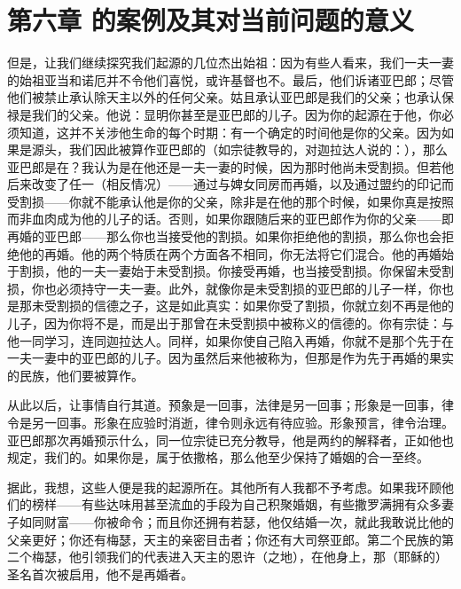 
\section{第六章 的案例及其对当前问题的意义}

但是，让我们继续探究我们起源的几位杰出始祖：因为有些人看来，我们一夫一妻的始祖亚当和诺厄并不令他们喜悦，或许基督也不。最后，他们诉诸亚巴郎；尽管他们被禁止承认除天主以外的任何父亲。姑且承认亚巴郎是我们的父亲；也承认保禄是我们的父亲。他说：显明你甚至是亚巴郎的儿子。因为你的起源在于他，你必须知道，这并不关涉他生命的每个时期：有一个确定的时间他是你的父亲。因为如果是源头，我们因此被算作亚巴郎的（如宗徒教导的，对迦拉达人说的：），那么亚巴郎是在？我认为是在他还是一夫一妻的时候，因为那时他尚未受割损。但若他后来改变了任一（相反情况）——通过与婢女同房而再婚，以及通过盟约的印记而受割损——你就不能承认他是你的父亲，除非是在他的那个时候，如果你真是按照而非血肉成为他的儿子的话。否则，如果你跟随后来的亚巴郎作为你的父亲——即再婚的亚巴郎——那么你也当接受他的割损。如果你拒绝他的割损，那么你也会拒绝他的再婚。他的两个特质在两个方面各不相同，你无法将它们混合。他的再婚始于割损，他的一夫一妻始于未受割损。你接受再婚，也当接受割损。你保留未受割损，你也必须持守一夫一妻。此外，就像你是未受割损的亚巴郎的儿子一样，你也是那未受割损的信德之子，这是如此真实：如果你受了割损，你就立刻不再是他的儿子，因为你将不是，而是出于那曾在未受割损中被称义的信德的。你有宗徒：与他一同学习，连同迦拉达人。同样，如果你使自己陷入再婚，你就不是那个先于在一夫一妻中的亚巴郎的儿子。因为虽然后来他被称为，但那是作为先于再婚的果实的民族，他们要被算作。\par

从此以后，让事情自行其道。预象是一回事，法律是另一回事；形象是一回事，律令是另一回事。形象在应验时消逝，律令则永远有待应验。形象预言，律令治理。亚巴郎那次再婚预示什么，同一位宗徒已充分教导，他是两约的解释者，正如他也规定，我们的。如果你是，属于依撒格，那么他至少保持了婚姻的合一至终。\par

据此，我想，这些人便是我的起源所在。其他所有人我都不予考虑。如果我环顾他们的榜样——有些达味用甚至流血的手段为自己积聚婚姻，有些撒罗满拥有众多妻子如同财富——你被命令；而且你还拥有若瑟，他仅结婚一次，就此我敢说比他的父亲更好；你还有梅瑟，天主的亲密目击者；你还有大司祭亚郎。第二个民族的第二个梅瑟，他引领我们的代表进入天主的恩许（之地），在他身上，那（耶稣的）圣名首次被启用，他不是再婚者。\par

